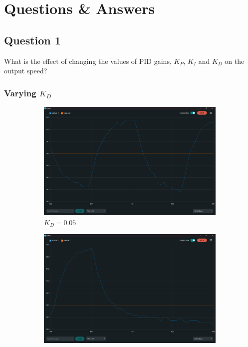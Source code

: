 \documentclass[12pt]{article}
\begin{document}
\pagebreak

\section{Questions \& Answers}

\subsection{Question 1}
What is the effect of changing the values of PID gains, $K_P$, $K_I$ and $K_D$ on the output speed?

\subsubsection{Varying $K_D$}

\begin{figure}[h]
    \centering
    \begin{subfigure}{.49\textwidth}
        \centering
        \includegraphics[width=0.95\linewidth]{images/q1/10_10_0.05.png}
		\caption{$K_D=0.05$}
    \end{subfigure}
    \begin{subfigure}{.49\textwidth}
        \centering
        \includegraphics[width=0.95\linewidth]{images/q1/10_10_0.1.png} 

\end{subfigure}
\end{figure}
\end{document}
